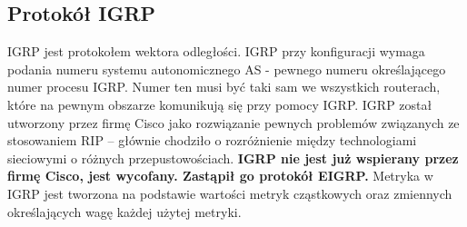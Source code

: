 \documentclass[a4paper]{article}
\begin{document}
\subsection{Protokół IGRP}
IGRP jest protokołem wektora odległości. IGRP przy konfiguracji wymaga podania numeru
systemu autonomicznego AS -  pewnego numeru
określającego numer procesu IGRP. Numer ten musi być taki sam we
wszystkich routerach, które na pewnym obszarze komunikują się przy pomocy IGRP.
IGRP został utworzony przez firmę Cisco jako rozwiązanie pewnych problemów związanych
ze stosowaniem RIP – głównie chodziło o rozróżnienie między technologiami sieciowymi o
różnych przepustowościach.
\textbf{IGRP nie jest już wspierany przez firmę Cisco, jest wycofany. Zastąpił go protokół EIGRP.}
Metryka w IGRP jest tworzona na podstawie wartości metryk cząstkowych oraz zmiennych
określających wagę każdej użytej metryki. \\
\end{document}
